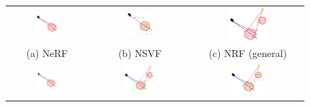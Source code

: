 \begin{figure}[!htbp]
    \begin{tabular}{ccc}
          \includegraphics[width=0.285\textwidth]{figures/sampling_nerf.png}
          & \includegraphics[width=0.26\textwidth]{figures/sampling_nsvf.png}
          & \includegraphics[width=0.355\textwidth]{figures/sampling_nrf.png}
          \\(a) NeRF \cite{mildenhall2020nerf} & (b) NSVF \cite{liu2021neural} & (c) NRF \cite{bi2020neural} (general)
          \\[6pt]\includegraphics[width=0.26\textwidth]{figures/sampling_nrf_colocated.png}
          & \includegraphics[width=0.32\textwidth]{figures/sampling_bfex.png}
          & \includegraphics[width=0.32\textwidth]{figures/sampling_iva.png}

\end{tabular}
\end{figure}
